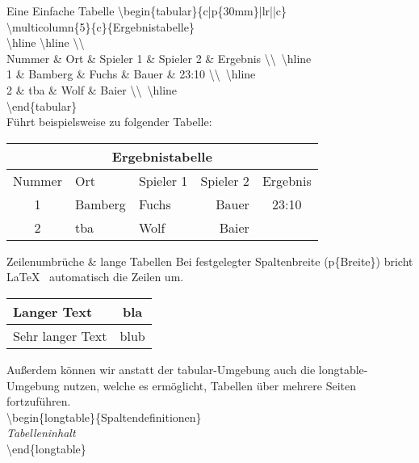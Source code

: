\begin{frame}{Eine Einfache Tabelle}
   \color{cturkis}\textbackslash begin\color{black}\{tabular\}\{c|p\{30mm\}|lr||c\}\\
   \textbackslash multicolumn\{5\}\{c\}\{Ergebnistabelle\}\\
   \color{cred}\textbackslash hline \textbackslash hline  \textbackslash\textbackslash\color{black}\\
   Nummer \& Ort \& Spieler 1 \& Spieler 2 \& Ergebnis \color{cred}\textbackslash\textbackslash~\textbackslash hline\color{black}\\ 
   1 \& Bamberg \& Fuchs \& Bauer \& 23:10 \color{cred}\textbackslash\textbackslash~\textbackslash hline\color{black}\\
   2 \& tba \& Wolf \& Baier \color{cred}\textbackslash\textbackslash~\textbackslash hline\color{black}\\
   \color{cturkis}\textbackslash end\color{black}\{tabular\}\\\vspace{1.5mm}
   F\"uhrt beispielsweise zu folgender Tabelle:\\\vspace{1.5mm}
   \begin{tabular}{c|p{30mm}|lr||c}
    \multicolumn{5}{c}{Ergebnistabelle}\\
    \hline \hline
    Nummer & Ort & Spieler 1 & Spieler 2 & Ergebnis \\\hline
    1 & Bamberg & Fuchs & Bauer & 23:10 \\ \hline
    2 & tba & Wolf & Baier \\\hline
   \end{tabular}
\end{frame}
\begin{frame}{Zeilenumbr\"uche \& lange Tabellen}
Bei festgelegter Spaltenbreite (p\{Breite\}) bricht \LaTeX~ automatisch die Zeilen um.\\
\begin{center}
\begin{tabular}{|p{20mm}|c|}\hline
    Langer Text &  bla\\\hline
    Sehr langer Text & blub \\\hline
\end{tabular}
\end{center}
\vspace{3mm}Au\ss erdem k\"onnen wir anstatt der \color{cpurple}tabular\color{black}-Umgebung auch die \color{cpurple}longtable\color{black}-Umgebung nutzen, welche es erm\"oglicht, Tabellen \"uber mehrere Seiten fortzuf\"uhren.\\\vspace{2mm}
\color{cturkis}\textbackslash begin\color{black}\{\color{cpurple}longtable\color{black}\}\{Spaltendefinitionen\}\\
   \textit{Tabelleninhalt}\\
   \color{cturkis}\textbackslash end\color{black}\{\color{cpurple}longtable\color{black}\}\
\end{frame}
